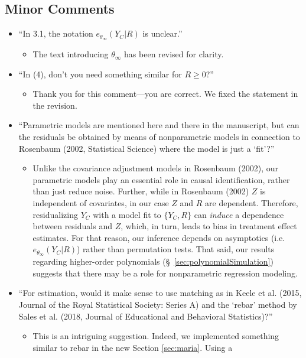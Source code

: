 \documentclass[12pt]{article}
\newcommand{\InfPar}[1]{\ensuremath{{#1}_{\infty}}}
\newcommand{\thetaInf}{\InfPar{\theta}}
\newcommand{\dt}[3][\theta]{\ensuremath{e_{#1}(#2| {#3})}}
\begin{document}
\subsection{Minor Comments}
\begin{itemize}
\item ``In 3.1, the notation $\dt[\thetaInf]{Y_{C}}{ R }$ is unclear.''
\begin{itemize}
  \item The text introducing $\thetaInf$ has been revised for clarity.
\end{itemize}
\item ``In (4), don’t you need something similar for $R\ge 0$?''
\begin{itemize}
 \item Thank you for this comment---you are correct. We fixed the
   statement in the revision.
 \end{itemize}
\item ``Parametric models are mentioned here and there in the
  manuscript, but can the residuals be obtained by means of
  nonparametric models in connection to Rosenbaum (2002, Statistical
  Science) where the model is just a `fit'?''
\begin{itemize}
 \item Unlike the covariance adjustment models in Rosenbaum (2002), our parametric models play an
   essential role in causal identification, rather than just reduce
   noise. Further, while in Rosenbaum (2002) $Z$ is independent of
   covariates, in our case $Z$ and $R$ are dependent. Therefore,
   residualizing $Y_C$ with a model fit to $\{Y_C,R\}$
   can \emph{induce} a dependence between residuals and $Z$, which, in turn, leads to
   bias in treatment effect estimates. For that reason, our inference
   depends on asymptotics (i.e. $\dt[\thetaInf]{Y_C}{R}$) rather than
   permutation tests. That said, our results regarding higher-order
   polynomials (\S~\ref{sec:polynomialSimulation}) suggests that there may be a role for nonparametric
   regression modeling.
\end{itemize}
\item ``For estimation, would it make sense to use matching as in Keele
  et al. (2015, Journal of the Royal Statistical Society: Series A)
  and the `rebar' method by Sales et al. (2018, Journal of Educational
  and Behavioral Statistics)?''
 \begin{itemize}
   \item This is an intriguing suggestion. Indeed, we implemented
     something similar to rebar in the new Section \ref{sec:maria}. Using a

\end{itemize}
\end{itemize}
\end{document}
